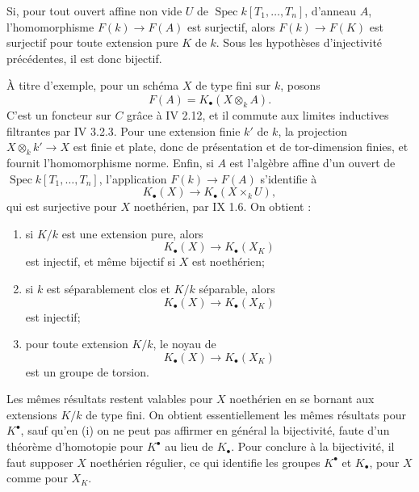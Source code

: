 \documentclass[11pt]{article}
\newcommand{\Gr}{\operatorname{Gr}}
\newcommand{\Spec}{\operatorname{Spec}}
\providecommand{\Pic}{\operatorname{Pic}}
\providecommand{\GL}{\operatorname{GL}}
\providecommand{\Gr}{\operatorname{Gr}}
\providecommand{\Coker}{\operatorname{Coker}}
\providecommand{\Supp}{\operatorname{Supp}}
\providecommand{\Gr}{\operatorname{G}}
\begin{document}
Si, pour tout ouvert affine non vide \(U\) de \(\Spec k[T_1,\ldots,T_n]\), d'anneau \(A\), l'homomorphisme \(F(k)\to F(A)\) est surjectif, alors \(F(k)\to F(K)\) est surjectif pour toute extension pure \(K\) de \(k\). Sous les hypothèses d'injectivité précédentes, il est donc bijectif.

À titre d'exemple, pour un schéma \(X\) de type fini sur \(k\), posons
\[
  F(A)=K_\bullet(X\otimes_k A).
\]
C'est un foncteur sur \(C\) grâce à IV 2.12, et il commute aux limites inductives filtrantes par IV 3.2.3. Pour une extension finie \(k'\) de \(k\), la projection \(X\otimes_k k'\to X\) est finie et plate, donc de présentation et de tor-dimension finies, et fournit l'homomorphisme norme. Enfin, si \(A\) est l'algèbre affine d'un ouvert de \(\Spec k[T_1,\ldots,T_n]\), l'application \(F(k)\to F(A)\) s'identifie à
\[
  K_\bullet(X)\longrightarrow K_\bullet(X\times_k U),
\]
qui est surjective pour \(X\) noethérien, par IX 1.6. On obtient :
\begin{enumerate}[label=(\roman*)]
\item si \(K/k\) est une extension pure, alors
\[
  K_\bullet(X)\longrightarrow K_\bullet(X_K)
\]
est injectif, et même bijectif si \(X\) est noethérien;
\item si \(k\) est séparablement clos et \(K/k\) séparable, alors
\[
  K_\bullet(X)\longrightarrow K_\bullet(X_K)
\]
est injectif;
\item pour toute extension \(K/k\), le noyau de
\[
  K_\bullet(X)\longrightarrow K_\bullet(X_K)
\]
est un groupe de torsion.
\end{enumerate}
Les mêmes résultats restent valables pour \(X\) noethérien en se bornant aux extensions \(K/k\) de type fini. On obtient essentiellement les mêmes résultats pour \(K^\bullet\), sauf qu'en (i) on ne peut pas affirmer en général la bijectivité, faute d'un théorème d'homotopie pour \(K^\bullet\) au lieu de \(K_\bullet\). Pour conclure à la bijectivité, il faut supposer \(X\) noethérien régulier, ce qui identifie les groupes \(K^\bullet\) et \(K_\bullet\), pour \(X\) comme pour \(X_K\).



\providecommand{\Isom}{\operatorname{Isom}}
\providecommand{\Hom}{\operatorname{Hom}}
\providecommand{\Coker}{\operatorname{Coker}}
\providecommand{\red}{\operatorname{red}}
\providecommand{\Nil}{\operatorname{Nil}}
\providecommand{\im}{\operatorname{Im}}
\providecommand{\coker}{\operatorname{coker}}
\providecommand{\Supp}{\operatorname{Supp}}
\providecommand{\fppf}{\mathrm{fppf}}
\providecommand{\zar}{\mathrm{zar}}
\providecommand{\GL}{\operatorname{GL}}
\providecommand{\Gr}{\operatorname{Gr}}
\providecommand{\Pic}{\operatorname{Pic}}
\providecommand{\Spec}{\operatorname{Spec}}
\providecommand{\V}{\operatorname{V}}
\providecommand{\Ass}{\operatorname{Ass}}
\end{document}
